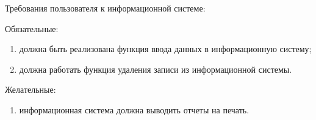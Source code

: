 Требования пользователя к информационной системе:

Обязательные:

\begin{enumerate}
    \item должна быть реализована функция ввода данных в информационную систему;
    \item должна работать функция удаления записи из информационной системы.
\end{enumerate}

Желательные:

\begin{enumerate}
    \item информационная система должна выводить отчеты на печать.
\end{enumerate}

\newpage
